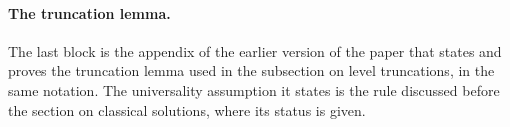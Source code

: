 \paragraph{The truncation lemma.}

The last block is the appendix of the earlier version of the paper that states and proves the truncation lemma used in the subsection on level truncations, in the same notation.
The universality assumption it states is the rule discussed before the section on classical solutions, where its status is given.


